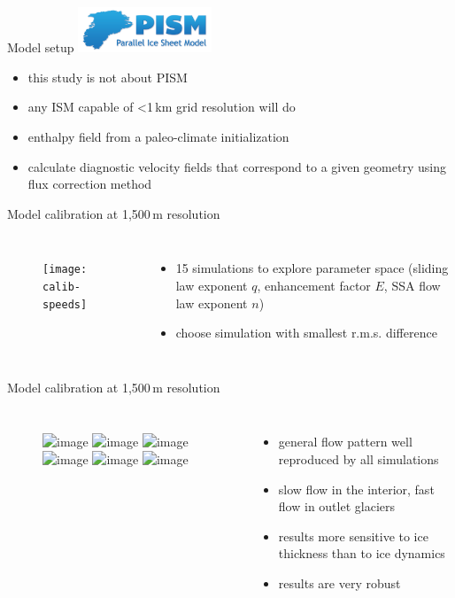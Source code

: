 \documentclass[hide notes,intlimits]{beamer}
\begin{document}
\begin{frame}{Model setup}
  \includegraphics[width=4cm]{pism-logo}
  \begin{itemize}
  \item this study is not about PISM
  \item any ISM capable of <1\,km grid resolution will do
  \item enthalpy field from a paleo-climate initialization
  \item calculate diagnostic velocity fields that correspond to a given geometry using flux correction method
  \end{itemize}
\end{frame}


\begin{frame}{Model calibration at 1,500\,m resolution}
  \vspace{-.5em}
  \begin{columns}
    \column[c]{6.5cm}
    \begin{figure}
      \texttt{[image: calib-speeds]}
    \end{figure}
    \column[c]{5.5cm}
    \begin{itemize}
    \item 15 simulations to explore parameter space (sliding law exponent $q$, enhancement factor $E$, SSA flow law exponent $n$)
    \item choose simulation with smallest r.m.s. difference
    \end{itemize}
  \end{columns}
\end{frame}

\begin{frame}{Model calibration at 1,500\,m resolution}
  \vspace{-.5em}
  \begin{columns}
    \column[c]{5cm}
    \begin{figure}
      \includegraphics<1>[width=\textwidth]{calib-speed-010-3}
      \includegraphics<2>[width=\textwidth]{calib-speed-025-3}
      \includegraphics<3>[width=\textwidth]{calib-speed-033-3}
      \includegraphics<4>[width=\textwidth]{calib-speed-050-3}
      \includegraphics<5>[width=\textwidth]{calib-speed-060-325}
      \includegraphics<6>[width=\textwidth]{calib-speed-080-3}
    \end{figure}
    \column[c]{5.5cm}
    \begin{itemize}
    \item general flow pattern well reproduced by all simulations
    \item slow flow in the interior, fast flow in outlet glaciers
    \item results more sensitive to ice thickness than to ice dynamics
    \item<6> results are very robust
    \end{itemize}
  \end{columns}
\end{frame}
\end{document}
